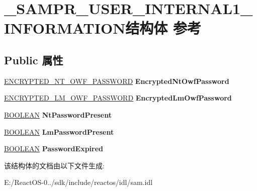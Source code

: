 \hypertarget{struct___s_a_m_p_r___u_s_e_r___i_n_t_e_r_n_a_l1___i_n_f_o_r_m_a_t_i_o_n}{}\section{\+\_\+\+S\+A\+M\+P\+R\+\_\+\+U\+S\+E\+R\+\_\+\+I\+N\+T\+E\+R\+N\+A\+L1\+\_\+\+I\+N\+F\+O\+R\+M\+A\+T\+I\+O\+N结构体 参考}
\label{struct___s_a_m_p_r___u_s_e_r___i_n_t_e_r_n_a_l1___i_n_f_o_r_m_a_t_i_o_n}
\subsection*{Public 属性}
\begin{DoxyCompactItemize}
\item 
\mbox{\label{struct___s_a_m_p_r___u_s_e_r___i_n_t_e_r_n_a_l1___i_n_f_o_r_m_a_t_i_o_n_a705b36748003b184cc4d7c983aaa91cd}} 
\hyperlink{struct___e_n_c_r_y_p_t_e_d___l_m___o_w_f___p_a_s_s_w_o_r_d}{E\+N\+C\+R\+Y\+P\+T\+E\+D\+\_\+\+N\+T\+\_\+\+O\+W\+F\+\_\+\+P\+A\+S\+S\+W\+O\+RD} {\bfseries Encrypted\+Nt\+Owf\+Password}
\item 
\mbox{\label{struct___s_a_m_p_r___u_s_e_r___i_n_t_e_r_n_a_l1___i_n_f_o_r_m_a_t_i_o_n_ae800e54fde18cb80e474be24d725b91f}} 
\hyperlink{struct___e_n_c_r_y_p_t_e_d___l_m___o_w_f___p_a_s_s_w_o_r_d}{E\+N\+C\+R\+Y\+P\+T\+E\+D\+\_\+\+L\+M\+\_\+\+O\+W\+F\+\_\+\+P\+A\+S\+S\+W\+O\+RD} {\bfseries Encrypted\+Lm\+Owf\+Password}
\item 
\mbox{\label{struct___s_a_m_p_r___u_s_e_r___i_n_t_e_r_n_a_l1___i_n_f_o_r_m_a_t_i_o_n_afe5a317d9e7ab0b24f00eb7aab56aaf0}} 
\hyperlink{_processor_bind_8h_a112e3146cb38b6ee95e64d85842e380a}{B\+O\+O\+L\+E\+AN} {\bfseries Nt\+Password\+Present}
\item 
\mbox{\label{struct___s_a_m_p_r___u_s_e_r___i_n_t_e_r_n_a_l1___i_n_f_o_r_m_a_t_i_o_n_a4b85f8e16845783d35c55e3eb8f04830}} 
\hyperlink{_processor_bind_8h_a112e3146cb38b6ee95e64d85842e380a}{B\+O\+O\+L\+E\+AN} {\bfseries Lm\+Password\+Present}
\item 
\mbox{\label{struct___s_a_m_p_r___u_s_e_r___i_n_t_e_r_n_a_l1___i_n_f_o_r_m_a_t_i_o_n_a5ee92e5d95106c9e417cc5d0fee334d8}} 
\hyperlink{_processor_bind_8h_a112e3146cb38b6ee95e64d85842e380a}{B\+O\+O\+L\+E\+AN} {\bfseries Password\+Expired}
\end{DoxyCompactItemize}


该结构体的文档由以下文件生成\+:\begin{DoxyCompactItemize}
\item 
E\+:/\+React\+O\+S-\/0../sdk/include/reactos/idl/sam.\+idl\end{DoxyCompactItemize}
